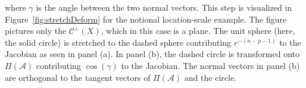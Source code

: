 \documentclass[ba]{imsart}
\newcommand{\bz}{\mbox{\boldmath $z$}}
\newcommand{\mc}{\mathcal}
\begin{document}
where $\gamma$ is the angle between the two normal vectors.
This step is visualized in Figure~\ref{fig:stretchDeform} for the notional
location-scale example.  The figure pictures only the $\mathcal{C}^{\perp}(X)$,
which in this case is a plane. The unit sphere (here, the
solid circle) is stretched to the dashed sphere contributing
$r^{-(n-p-1)}$ to the Jacobian as seen in panel (a). In panel (b), the
dashed circle is transformed onto $\Pi(\mc A)$ contributing
$\cos(\gamma)$ to the Jacobian. The normal vectors in panel (b) are
orthogonal to the tangent vectors of $\Pi(\mc A)$ and the circle. %

\end{document}

